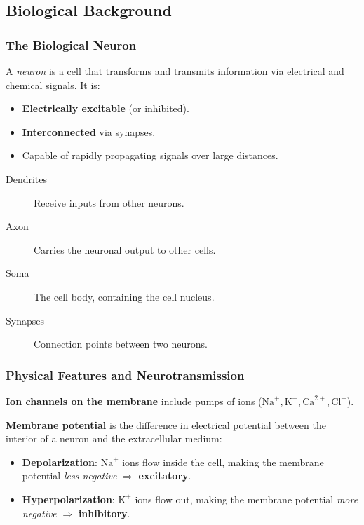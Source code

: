 \documentclass[11pt,a4paper]{article}
\begin{document}
\subsection{Biological Background}

\subsubsection{The Biological Neuron}

A \emph{neuron} is a cell that transforms and transmits information via electrical and chemical signals. It is:
\begin{itemize}[leftmargin=*]
    \item \textbf{Electrically excitable} (or inhibited).
    \item \textbf{Interconnected} via synapses.
    \item Capable of rapidly propagating signals over large distances.
\end{itemize}

\begin{definitionbox}[title=Neuron Morphology]
\begin{description}
    \item[Dendrites] Receive inputs from other neurons.
    \item[Axon] Carries the neuronal output to other cells.
    \item[Soma] The cell body, containing the cell nucleus.
    \item[Synapses] Connection points between two neurons.
\end{description}
\end{definitionbox}

\subsubsection{Physical Features and Neurotransmission}

\textbf{Ion channels on the membrane} include pumps of ions ($\mathrm{Na}^+, \mathrm{K}^+, \mathrm{Ca}^{2+}, \mathrm{Cl}^-$).

\textbf{Membrane potential} is the difference in electrical potential between the interior of a neuron and the extracellular medium:
\begin{itemize}[leftmargin=*]
    \item \textbf{Depolarization}: $\mathrm{Na}^+$ ions flow inside the cell, making the membrane potential \emph{less negative} $\Rightarrow$ \textbf{excitatory}.
    \item \textbf{Hyperpolarization}: $\mathrm{K}^+$ ions flow out, making the membrane potential \emph{more negative} $\Rightarrow$ \textbf{inhibitory}.
\end{itemize}
\end{document}
